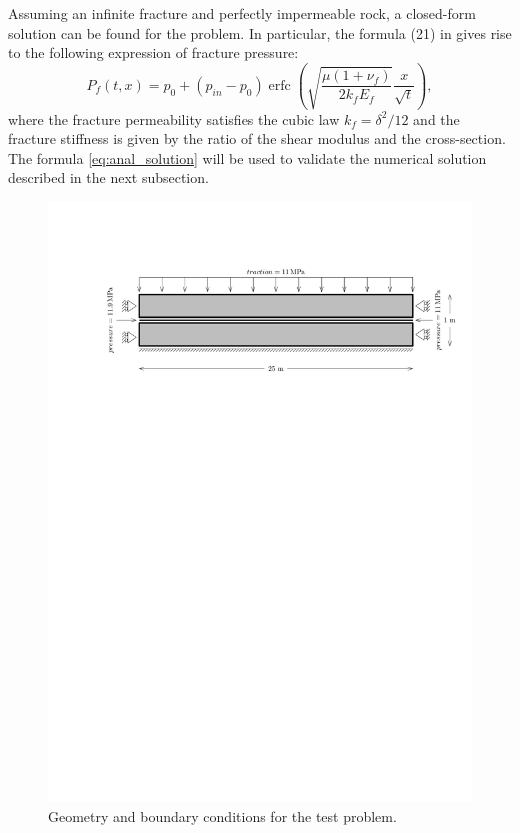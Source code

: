 \documentclass[a4paper]{article}
\numberwithin{equation}{section}
\def\erfc{\operatorname{erfc}}
\newcommand{\eq}[1]{\begin{equation}#1\end{equation}}
\begin{document}
Assuming an infinite fracture and perfectly impermeable rock, a closed-form solution can be found for the problem.
In particular, the formula (21) in \cite{Wijesinghe1986} gives rise to the following expression of fracture pressure:
% 
\eq{ \label{eq:anal_solution} P_f(t,x) = p_0 + (p_{in}-p_0)\erfc\left(\sqrt{\frac{\mu(1+\nu_f)}{2 k_f E_f}} \frac{x}{\sqrt{t}}\right), }
%
where the fracture permeability satisfies the cubic law $k_f=\delta^2/12$ and the fracture stiffness is given by the ratio of the shear modulus and the cross-section.
The formula \eqref{eq:anal_solution} will be used to validate the numerical solution described in the next subsection.

\begin{figure}
\centering
\includegraphics[width=\textwidth]{figures/test-cubic-law-bc}
\caption{Geometry and boundary conditions for the test problem.}
\label{fig:test_geom}
\end{figure}
\end{document}
